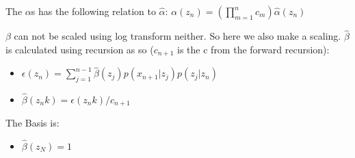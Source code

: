 \documentclass{article}
\begin{document}
  The $\alpha$s  has the following relation to $\hat{\alpha}$: $\alpha(z_n) = \left(\prod_{m=1}^n c_m \right) \hat{\alpha}(z_n)$

  $\beta$ can not be scaled using log transform neither. So here we also make a scaling.
  $\hat{\beta}$ is calculated using recursion as so ($c_{n+1}$ is the c from the forward recursion):\\
  \begin{itemize}
    \item $\epsilon(z_n) = \sum_{j=1}^{n-1}\hat{\beta}(z_j)p(x_{n+1} | z_j)p(z_j | z_n)$
    \item $\hat{\beta}(z_nk) = \epsilon(z_nk)/c_{n+1}$
  \end{itemize}
  The Basis is:
  \begin{itemize}
    \item $\hat{\beta}(z_N) = 1$
  \end{itemize}
\end{document}
